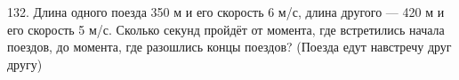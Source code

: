 132. Длина одного поезда 350 м и его скорость 6 м/с, длина другого --- 420 м и его скорость 5 м/с. Сколько секунд пройдёт от момента, где встретились начала поездов, до момента, где разошлись концы поездов? (Поезда едут навстречу друг другу)\\
